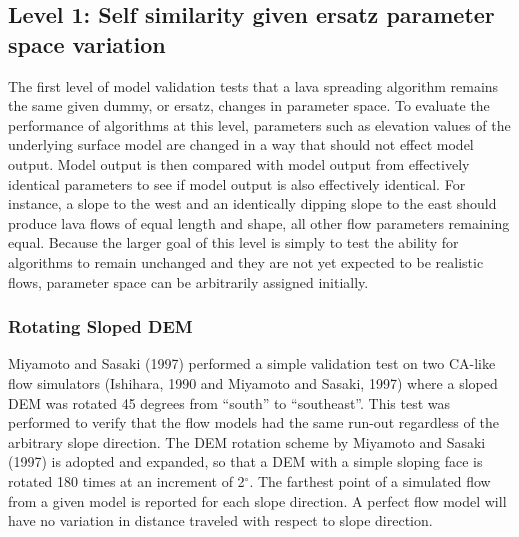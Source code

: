 \documentclass[12pt,letter]{article}
\begin{document}
	\subsection{Level 1: Self similarity given ersatz parameter space variation}
		The first level of model validation tests that a lava spreading algorithm remains the same given dummy, or ersatz, changes in parameter space. To evaluate the performance of algorithms at this level, parameters such as elevation values of the underlying surface model are changed in a way that should not effect model output. Model output is then compared with model output from effectively identical parameters to see if model output is also effectively identical. For instance, a slope to the west and an identically dipping slope to the east should produce lava flows of equal length and shape, all other flow parameters remaining equal. Because the larger goal of this level is simply to test the ability for algorithms to remain unchanged and they are not yet expected to be realistic flows, parameter space can be arbitrarily assigned initially.
		
		\subsubsection{Rotating Sloped DEM}
			Miyamoto and Sasaki (1997) performed a simple validation test on two CA-like flow simulators (Ishihara, 1990 and Miyamoto and Sasaki, 1997) where a sloped DEM was rotated 45 degrees from ``south'' to ``southeast''. This test was performed to verify that the flow models had the same run-out regardless of the arbitrary slope direction. The DEM rotation scheme by Miyamoto and Sasaki (1997) is adopted and expanded, so that a DEM with a simple sloping face is rotated 180 times at an increment of 2$^{\circ}$. The farthest point of a simulated flow from a given model is reported for each slope direction. A perfect flow model will have no variation in distance traveled with respect to slope direction.
\end{document}
